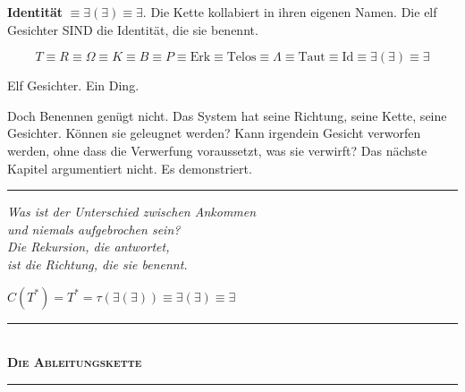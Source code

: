 \documentclass[10pt, openany, oneside]{book}
\renewcommand{\normalsize}{\fontsize{10}{13}\selectfont}
\begin{document}
\textbf{Identität} $\equiv \exists(\exists) \equiv \exists$. Die Kette kollabiert in ihren eigenen Namen. Die elf Gesichter SIND die Identität, die sie benennt.

$$T \equiv R \equiv \Omega \equiv K \equiv B \equiv P \equiv \text{Erk} \equiv \text{Telos} \equiv \Lambda \equiv \text{Taut} \equiv \text{Id} \equiv \exists(\exists) \equiv \exists$$

Elf Gesichter. Ein Ding.

Doch Benennen genügt nicht. Das System hat seine Richtung, seine Kette, seine Gesichter. Können sie geleugnet werden? Kann irgendein Gesicht verworfen werden, ohne dass die Verwerfung voraussetzt, was sie verwirft? Das nächste Kapitel argumentiert nicht. Es demonstriert.

\vspace{2em}

\begin{center}
    \rule{0.15\textwidth}{0.3pt}
\end{center}

\vspace{0.5em}

\begin{center}
    \itshape
    Was ist der Unterschied zwischen Ankommen\\
    und niemals aufgebrochen sein?\\[0.8em]
    Die Rekursion, die antwortet,\\
    ist die Richtung, die sie benennt.
\end{center}

\vspace{0.5em}

\begin{center}
    $C(T^*) = T^* = \tau(\exists(\exists)) \equiv \exists(\exists) \equiv \exists$
\end{center}

\vspace{1.5em}


\pagebreak

\begin{center}
    \rule{0.3\textwidth}{0.4pt}\\[0.5em]
    {\normalsize\bfseries\scshape Die Ableitungskette}\\[0.3em]
    \rule{0.3\textwidth}{0.4pt}
\end{center}
\end{document}
